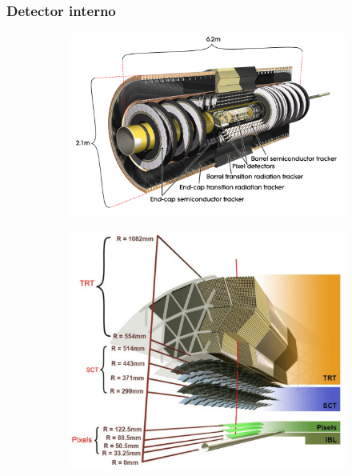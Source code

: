 \documentclass[10pt, compress,spanish]{beamer}
\begin{document}
\begin{frame}[fragile]
\frametitle{Detector interno}

\small

\begin{figure}
\centering
  \begin{subfigure}{0.45\textwidth}
    \includegraphics[scale=0.045]{ID-eps-converted-to.pdf} 
  \end{subfigure}
  \hfill
  \begin{subfigure}{0.45\textwidth}
    \includegraphics[scale=0.2]{ID_2.pdf}
  \end{subfigure}
\end{figure}




\end{frame}
\end{document}
